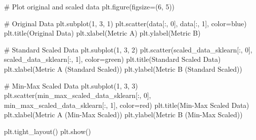 \documentclass[
  letterpaper,
  DIV=11,
  numbers=noendperiod]{scrreprt}
\newenvironment{Shaded}{\begin{snugshade}}{\end{snugshade}}
\newcommand{\CommentTok}[1]{\textcolor[rgb]{0.37,0.37,0.37}{#1}}
\newcommand{\DecValTok}[1]{\textcolor[rgb]{0.68,0.00,0.00}{#1}}
\newcommand{\NormalTok}[1]{\textcolor[rgb]{0.00,0.23,0.31}{#1}}
\newcommand{\OperatorTok}[1]{\textcolor[rgb]{0.37,0.37,0.37}{#1}}
\newcommand{\StringTok}[1]{\textcolor[rgb]{0.13,0.47,0.30}{#1}}
\theoremstyle{plain}
\theoremstyle{definition}
\theoremstyle{remark}
\begin{document}
\begin{Shaded}
\begin{Highlighting}[]
\CommentTok{\# Plot original and scaled data}
\NormalTok{plt.figure(figsize}\OperatorTok{=}\NormalTok{(}\DecValTok{6}\NormalTok{, }\DecValTok{5}\NormalTok{))}

\CommentTok{\# Original Data}
\NormalTok{plt.subplot(}\DecValTok{1}\NormalTok{, }\DecValTok{3}\NormalTok{, }\DecValTok{1}\NormalTok{)}
\NormalTok{plt.scatter(data[:, }\DecValTok{0}\NormalTok{], data[:, }\DecValTok{1}\NormalTok{], color}\OperatorTok{=}\StringTok{\textquotesingle{}blue\textquotesingle{}}\NormalTok{)}
\NormalTok{plt.title(}\StringTok{\textquotesingle{}Original Data\textquotesingle{}}\NormalTok{)}
\NormalTok{plt.xlabel(}\StringTok{\textquotesingle{}Metric A\textquotesingle{}}\NormalTok{)}
\NormalTok{plt.ylabel(}\StringTok{\textquotesingle{}Metric B\textquotesingle{}}\NormalTok{)}

\CommentTok{\# Standard Scaled Data}
\NormalTok{plt.subplot(}\DecValTok{1}\NormalTok{, }\DecValTok{3}\NormalTok{, }\DecValTok{2}\NormalTok{)}
\NormalTok{plt.scatter(scaled\_data\_sklearn[:, }\DecValTok{0}\NormalTok{], scaled\_data\_sklearn[:, }\DecValTok{1}\NormalTok{], color}\OperatorTok{=}\StringTok{\textquotesingle{}green\textquotesingle{}}\NormalTok{)}
\NormalTok{plt.title(}\StringTok{\textquotesingle{}Standard Scaled Data\textquotesingle{}}\NormalTok{)}
\NormalTok{plt.xlabel(}\StringTok{\textquotesingle{}Metric A (Standard Scaled)\textquotesingle{}}\NormalTok{)}
\NormalTok{plt.ylabel(}\StringTok{\textquotesingle{}Metric B (Standard Scaled)\textquotesingle{}}\NormalTok{)}

\CommentTok{\# Min{-}Max Scaled Data}
\NormalTok{plt.subplot(}\DecValTok{1}\NormalTok{, }\DecValTok{3}\NormalTok{, }\DecValTok{3}\NormalTok{)}
\NormalTok{plt.scatter(min\_max\_scaled\_data\_sklearn[:, }\DecValTok{0}\NormalTok{], min\_max\_scaled\_data\_sklearn[:, }\DecValTok{1}\NormalTok{], color}\OperatorTok{=}\StringTok{\textquotesingle{}red\textquotesingle{}}\NormalTok{)}
\NormalTok{plt.title(}\StringTok{\textquotesingle{}Min{-}Max Scaled Data\textquotesingle{}}\NormalTok{)}
\NormalTok{plt.xlabel(}\StringTok{\textquotesingle{}Metric A (Min{-}Max Scaled)\textquotesingle{}}\NormalTok{)}
\NormalTok{plt.ylabel(}\StringTok{\textquotesingle{}Metric B (Min{-}Max Scaled)\textquotesingle{}}\NormalTok{)}

\NormalTok{plt.tight\_layout()}
\NormalTok{plt.show()}
\end{Highlighting}
\end{Shaded}
\end{document}
